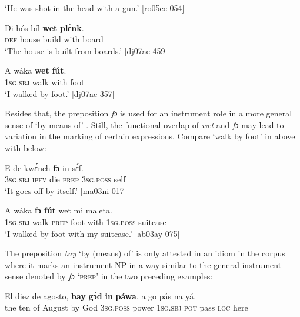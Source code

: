 \glt ‘He was shot in the head with a gun.’ [ro05ee 054]
\z


\ea%
    \label{ex:key:1066}
    \gll Di  hós    bíl    \textbf{wet}    \textbf{plɛ́nk}.\\
\textsc{def}  house  build  with    board\\

\glt ‘The house is built from boards.’ [dj07ae 459]
\z


\ea%
    \label{ex:key:1067}
    \gll A    wáka  \textbf{wet}    \textbf{fút}.\\
\textsc{1sg.sbj}  walk  with    foot\\

\glt ‘I walked by foot.’ [dj07ae 357]
\z

Besides that, the preposition \textit{fɔ} is used for an instrument role in a more general sense of ‘by means of’ . Still, the functional overlap of \textit{wet} and \textit{fɔ} may lead to variation in the marking of certain expressions. Compare ‘walk by foot’ in  above with  below: 


\ea%
    \label{ex:key:1068}
    \gll E    de  kwɛ́nch  \textbf{fɔ}  in    sɛ́f.\\
\textsc{3sg.sbj}  \textsc{ipfv}  die    \textsc{prep}  \textsc{3sg.poss}  self\\

\glt ‘It goes off by itself.’ [ma03ni 017]
\z


\ea%
    \label{ex:key:1069}
    \gll A    wáka  \textbf{fɔ}  \textbf{fút}  wet    mi    maleta.\\
\textsc{1sg.sbj}  walk  \textsc{prep}  foot  with    \textsc{1sg.poss}  suitcase\\

\glt ‘I walked by foot with my suitcase.’ [ab03ay 075]
\z

The preposition \textit{bay} ‘by (means) of’ is only attested in an idiom in the corpus where it marks an instrument NP in a way similar to the general instrument sense denoted by \textit{fɔ} ‘\textsc{prep}’ in the two preceding examples:


\ea%
    \label{ex:key:1070}
    \gll El  diez  de  agosto,  \textbf{bay}  \textbf{gɔ́d}  \textbf{in}    \textbf{páwa},  a    go  pás  na  yá.\\
the  ten  of  August  by  God  \textsc{3sg.poss}  power  \textsc{1sg.sbj}  \textsc{pot}  pass  \textsc{loc}  here\\

